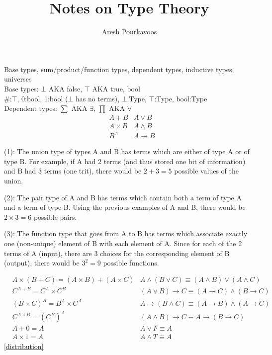 \documentclass{article}
\begin{document}
\title{Notes on Type Theory}
\author{Aresh Pourkavoos}
\maketitle

Base types, sum/product/function types, dependent types, inductive types, universes \\
Base types: $\bot$ AKA false, $\top$ AKA true, bool \\
\#:$\top$, 0:bool, 1:bool ($\bot$ has no terms), $\bot$:Type, $\top$:Type, bool:Type \\

Dependent types: $\sum$ AKA $\exists$, $\prod$ AKA $\forall$ \\

\begin{align}
  & A+B & A \lor B \\
  & A \times B & A \land B \\
  & B^A & A \rightarrow B
\end{align}

(1):
The union type of types A and B has terms which are either of type A or of type B.
For example, if A had 2 terms (and thus stored one bit of information) and B had 3 terms (one trit),
there would be $2+3=5$ possible values of the union.

(2):
The pair type of A and B has terms which contain both a term of type A and a term of type B.
Using the previous examples of A and B, there would be $2 \times 3 = 6$ possible pairs.

(3):
The function type that goes from A to B has terms which associate exactly one (non-unique) element of B with each element of A.
Since for each of the 2 terms of A (input), there are 3 choices for the corresponding element of B (output),
there would be $3^2=9$ possible functions.

\begin{align}
  & A \times (B+C) = (A \times B)+(A \times C) & A \land (B \lor C) \equiv (A \land B) \lor (A \land C) \label{distribution} \\
  & C^{A+B} = C^A \times C^B & (A \lor B) \rightarrow C \equiv (A \rightarrow C) \land (B \rightarrow C) \label{cases} \\
  & (B \times C)^A = B^A \times C^A & A \rightarrow (B \land C) \equiv (A \rightarrow B) \land (A \rightarrow C) \\
  & C^{A \times B} = (C^B)^A & (A \land B) \rightarrow C \equiv A \rightarrow (B \rightarrow C) \label{currying} \\
  & A+0 = A & A \lor F \equiv A \label{false} \\
  & A \times 1 = A & A \land T \equiv A \label{true}
\end{align}
\ref{distribution}
\end{document}
